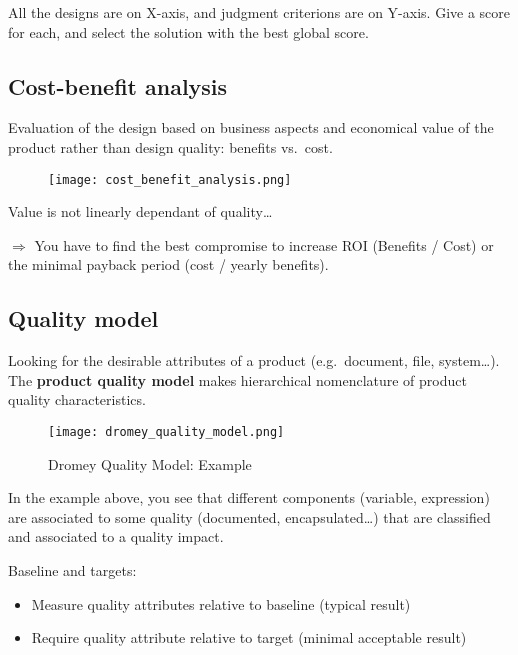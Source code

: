 All the designs are on X-axis, and judgment criterions are on Y-axis. 
Give a score for each, and select the solution with the best global score.

\subsection{Cost-benefit analysis}

Evaluation of the design based on business aspects and economical value
of the product rather than design quality: benefits vs.\ cost.

\begin{figure}[!ht]
    \centering
    \texttt{[image: cost\_benefit\_analysis.png]}
\end{figure}

Value is not linearly dependant of quality\ldots

$\Rightarrow$ You have to find the best compromise to increase ROI
(Benefits / Cost) or the minimal payback period (cost / yearly
benefits).

\subsection{Quality model}

Looking for the desirable attributes of a product (e.g.\ document, file,
system\ldots).
The \textbf{product quality model} makes hierarchical nomenclature of product quality characteristics. 
\newline

\begin{figure}[!ht]
    \centering
    \texttt{[image: dromey\_quality\_model.png]}
    \caption{Dromey Quality Model: Example}
\end{figure}

In the example above, you see that different components (variable,
expression) are associated to some quality (documented,
encapsulated\ldots) that are classified and associated to a quality
impact. 

Baseline and targets:
\begin{itemize}
    \item Measure quality attributes relative to baseline (typical result)
    \item Require quality attribute relative to target (minimal acceptable result)
\end{itemize}
